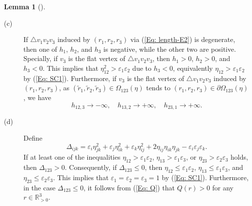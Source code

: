 \documentclass[12pt]{amsart}
\theoremstyle{definition}
\newtheorem{lemma}[theorem]{Lemma}
\begin{document}
\begin{lemma}[\cite{Xu 1}]
\begin{description}
\item[(c)]
If $\triangle v_1v_2v_3$ induced by $(r_1, r_2, r_3)$ via (\ref{Eq: length-E2}) is degenerate, 
then one of $h_1$, $h_2$, and $h_3$ is negative, while the other two are positive. 
Specially, if $v_3$ is the flat vertex of $\triangle v_1v_2v_3$, 
then $h_1>0$, $h_2>0$, and $h_3<0$. 
This implies that $\eta^2_{12}>\varepsilon_1\varepsilon_2$ due to $h_3<0$, equivalently $\eta_{12}>\varepsilon_1\varepsilon_2$ by (\ref{Eq: SC1}). Furthermore, if $v_3$ is the flat vertex of $\triangle v_1v_2v_3$ induced by $(r_1, r_2, r_3)$, as $(\tilde{r}_1, \tilde{r}_2, \tilde{r}_3) \in \Omega_{123}(\eta)$ tends to $(r_1, r_2, r_3) \in \partial \Omega_{123}(\eta)$, we have
\begin{equation*}
h_{12,3} \rightarrow -\infty, \quad
h_{13,2} \rightarrow +\infty, \quad
h_{23,1} \rightarrow +\infty.
\end{equation*}

\item[(d)]
Define
\begin{equation}\label{Eq: F1}
\Delta_{ijk}
=\varepsilon_i\eta_{jk}^2+\varepsilon_j\eta_{ik}^2
+\varepsilon_k\eta_{ij}^2+2\eta_{ij}\eta_{ik}\eta_{jk}
-\varepsilon_i\varepsilon_j\varepsilon_k.
\end{equation}
If at least one of the inequalities $\eta_{12}>\varepsilon_1\varepsilon_2$, $\eta_{13}>\varepsilon_1\varepsilon_3$, or $\eta_{23}>\varepsilon_2\varepsilon_3$ holds, then $\Delta_{123}>0$. Consequently, if $\Delta_{123}\leq 0$, then $\eta_{12}\leq\varepsilon_1\varepsilon_2$, $\eta_{13}\leq\varepsilon_1\varepsilon_3$, and $\eta_{23}\leq\varepsilon_2\varepsilon_3$. This implies that $\varepsilon_1=\varepsilon_2=\varepsilon_3=1$ by (\ref{Eq: SC1}). 
Furthermore, in the case $\Delta_{123}\leq 0$,
it follows from (\ref{Eq: Q}) that $Q(r)>0$ for any $r\in\mathbb{R}_{>0}^3$.
\end{description}
\end{lemma}
\end{document}
